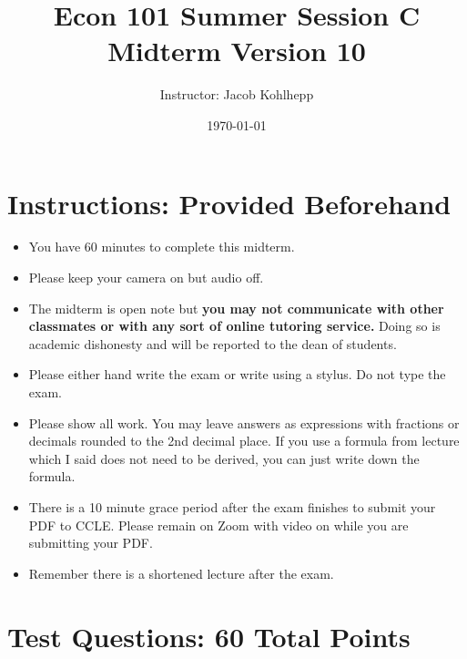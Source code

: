 \documentclass{article}
\begin{document}
\title{Econ 101 Summer Session C Midterm Version 10}
\author{Instructor: Jacob Kohlhepp}
\date{\today}

\maketitle

\section{Instructions: Provided Beforehand}
\begin{itemize}
    \item You have 60 minutes to complete this midterm.
    \item Please keep your camera on but audio off.
    \item The midterm is open note but \textbf{you may not communicate with other classmates or with any sort of online tutoring service.} Doing so is academic dishonesty and will be reported to the dean of students.
    \item Please either hand write the exam or write using a stylus. Do not type the exam.
    \item Please show all work. You may leave answers as expressions with fractions or decimals rounded to the 2nd decimal place. If you use a formula from lecture which I said does not need to be derived, you can just write down the formula.
    \item There is a 10 minute grace period after the exam finishes to submit your PDF to CCLE. Please remain on Zoom with video on while you are submitting your PDF.
    \item Remember there is a shortened lecture after the exam.
\end{itemize}

\section{Test Questions: 60 Total Points}
\end{document}
